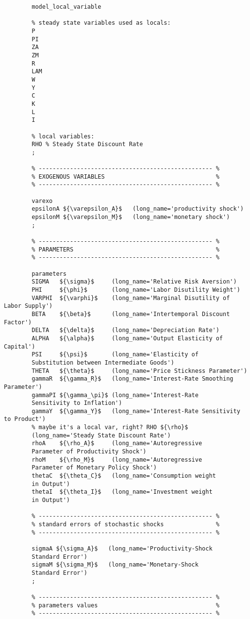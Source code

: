 \documentclass[../thesis.tex]{subfiles}
\begin{document}
{\begin{verbatim}
		model_local_variable
		
		% steady state variables used as locals:
		P
		PI
		ZA
		ZM
		R
		LAM
		W
		Y
		C
		K
		L
		I
		
		% local variables:
		RHO % Steady State Discount Rate
		;
		
		% -------------------------------------------------- %
		% EXOGENOUS VARIABLES                                %
		% -------------------------------------------------- %
		
		varexo
		epsilonA ${\varepsilon_A}$   (long_name='productivity shock')
		epsilonM ${\varepsilon_M}$   (long_name='monetary shock')
		;
		
		% -------------------------------------------------- %
		% PARAMETERS                                         %
		% -------------------------------------------------- %
		
		parameters
		SIGMA   ${\sigma}$     (long_name='Relative Risk Aversion')
		PHI     ${\phi}$       (long_name='Labor Disutility Weight')  
		VARPHI  ${\varphi}$    (long_name='Marginal Disutility of Labor Supply')
		BETA    ${\beta}$      (long_name='Intertemporal Discount Factor')
		DELTA   ${\delta}$     (long_name='Depreciation Rate')
		ALPHA   ${\alpha}$     (long_name='Output Elasticity of Capital')
		PSI     ${\psi}$       (long_name='Elasticity of 
		Substitution between Intermediate Goods')
		THETA   ${\theta}$     (long_name='Price Stickness Parameter')
		gammaR  ${\gamma_R}$   (long_name='Interest-Rate Smoothing Parameter')
		gammaPI ${\gamma_\pi}$ (long_name='Interest-Rate 
		Sensitivity to Inflation')
		gammaY  ${\gamma_Y}$   (long_name='Interest-Rate Sensitivity to Product')
		% maybe it's a local var, right? RHO ${\rho}$ 
		(long_name='Steady State Discount Rate')
		rhoA    ${\rho_A}$     (long_name='Autoregressive 
		Parameter of Productivity Shock')
		rhoM    ${\rho_M}$     (long_name='Autoregressive 
		Parameter of Monetary Policy Shock')
		thetaC  ${\theta_C}$   (long_name='Consumption weight 
		in Output')
		thetaI  ${\theta_I}$   (long_name='Investment weight 
		in Output')
		
		% -------------------------------------------------- % 
		% standard errors of stochastic shocks               %
		% -------------------------------------------------- %
		
		sigmaA ${\sigma_A}$   (long_name='Productivity-Shock 
		Standard Error')
		sigmaM ${\sigma_M}$   (long_name='Monetary-Shock 
		Standard Error')
		;
		
		% -------------------------------------------------- %
		% parameters values                                  %
		% -------------------------------------------------- % 
		

\end{verbatim}}
\end{document}
